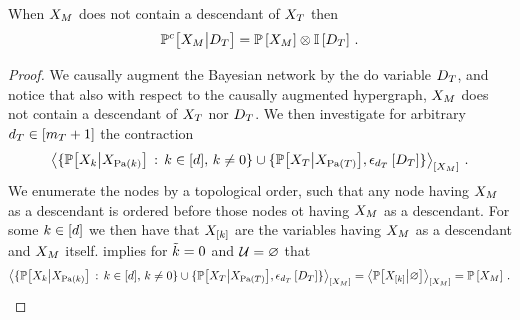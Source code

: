 \begin{lemma}\label{lem:bdCriterionDoInfluence}
    When $X_{M}$ does not contain a descendant of $X_{T}$ then
    \begin{align*}
        \mathbb{P}^{c}\big[X_{M}\big|D_{T}\big]
        = \mathbb{P}\left[X_{M}\right] \otimes \mathbb{I}\left[D_{T}\right] \, .
    \end{align*}
\end{lemma}
\begin{proof}
    We causally augment the Bayesian network by the do variable $D_{T}$, and notice that also with respect to the causally augmented hypergraph, $X_{M}$ does not contain a descendant of $X_{T}$ nor $D_{T}$. %
    We then investigate for arbitrary $d_{T}\in[m_{T}+1]$ the contraction
    \begin{align*}
        \left\langle 
            \{\mathbb{P}\big[X_{k}\big|X_{\mathrm{Pa}(k)}\big] \,:\, k\in[d],\,k\neq 0\}
            \cup \{\mathbb{P}\big[X_{T}\big|X_{\mathrm{Pa}(T)}\big],\epsilon_{d_{T}}\left[D_{T}\right]\}
        \right\rangle_{\left[ X_{M} \right]} \, .
    \end{align*}
    We enumerate the nodes by a topological order, such that any node having $X_{M}$ as a descendant is ordered before those nodes ot having  $X_{M}$ as a descendant.
    For some $k\in[d]$ we then have that $X_{[k]}$ are the variables having $X_{M}$ as a descendant and $X_{M}$ itself.
     implies for $\tilde{k}=0$ and $\mathcal{U}=\varnothing$ that
    \begin{align*}
        \left\langle 
            \{\mathbb{P}\big[X_{k}\big|X_{\mathrm{Pa}(k)}\big] \,:\, k\in[d],\,k\neq 0\}
            \cup \{\mathbb{P}\big[X_{T}\big|X_{\mathrm{Pa}(T)}\big],\epsilon_{d_{T}}\left[D_{T}\right]\}
        \right\rangle_{\left[ X_{M} \right]}
        = \left\langle \mathbb{P}\big[X_{[k]}\big|\varnothing\big]\right\rangle_{\left[ X_{M} \right]}
        = \mathbb{P}\left[X_{M}\right] \, .
    \end{align*}
\end{proof}


